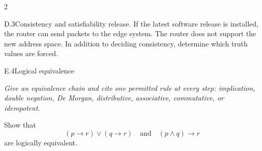 \documentclass[9pt]{extarticle}
\begin{document}
\begin{multicols}{2}
\begin{CoreProblem}{D.3}{Consistency and satisfiability}
release. If the latest software release is installed, the router can send
packets to the edge system. The router does not support the new address space.
In addition to deciding consistency, determine which truth values are forced.
\end{CoreProblem}
\begin{CoreProblem}{E.4}{Logical equivalence}
{\scriptsize\textit{Give an equivalence chain and cite one permitted rule at every step: implication, double negation, De Morgan, distributive, associative, commutative, or idempotent.}\par}
Show that
\[
  (p\to r)\lor(q\to r)
  \quad\text{and}\quad
  (p\land q)\to r
\]
are logically equivalent.
\end{CoreProblem}
\end{multicols}
\CoreWorkArea
\FormBreak
{}
\end{document}
